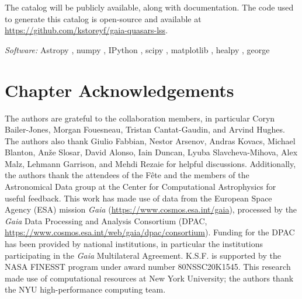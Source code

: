 The catalog will be publicly available, along with documentation.
The code used to generate this catalog is open-source and available at \url{https://github.com/kstoreyf/gaia-quasars-lss}.

\textit{Software:} Astropy \citep{the_astropy_collaboration_astropy_2013, the_astropy_collaboration_astropy_2018, the_astropy_collaboration_astropy_2022}, numpy \citep{VanDerWalt2011}, IPython \citep{Perez2007}, scipy \citep{Virtanen2020}, matplotlib \citep{Hunter2007}, healpy \citep{gorski_healpix_2005, zonca_healpy_2019}, george \citep{Ambikasaran2016}

\section{Chapter Acknowledgements}

The authors are grateful to the \Gaia collaboration members, in particular Coryn Bailer-Jones, Morgan Fouesneau, Tristan Cantat-Gaudin, and Arvind Hughes.
The authors also thank Giulio Fabbian, Nestor Arsenov, Andras Kovacs, Michael Blanton, An\v{z}e Slosar, David Alonso, Iain Duncan, Lyuba Slavcheva-Mihova, Alex Malz, Lehmann Garrison, and Mehdi Rezaie for helpful discussions.
Additionally, the authors thank the attendees of the \Gaia F\^{e}te and the members of the Astronomical Data group at the Center for Computational Astrophysics for useful feedback.
This work has made use of data from the European Space Agency (ESA) mission {\it Gaia} (\url{https://www.cosmos.esa.int/gaia}), processed by the {\it Gaia} Data Processing and Analysis Consortium (DPAC, \url{https://www.cosmos.esa.int/web/gaia/dpac/consortium}). 
Funding for the DPAC has been provided by national institutions, in particular the institutions participating in the {\it Gaia} Multilateral Agreement.
K.S.F. is supported by the NASA FINESST program under award number 80NSSC20K1545.
This research made use of computational resources at New York University; the authors thank the NYU high-performance computing team.

